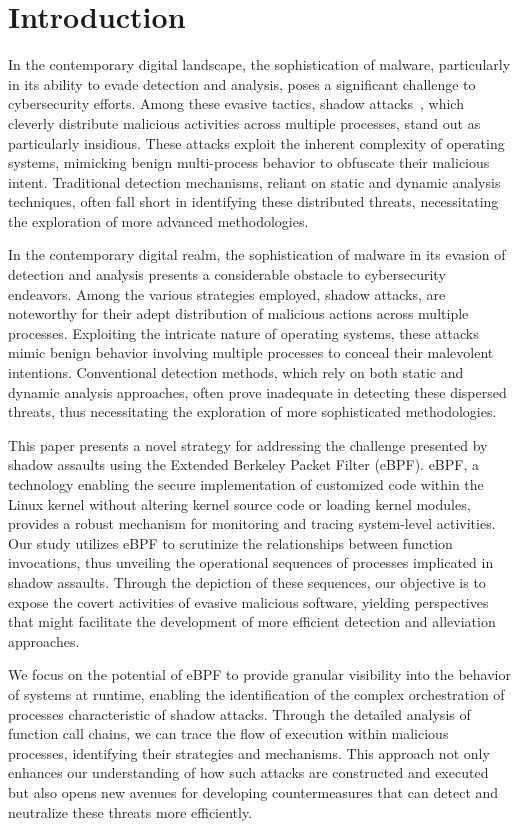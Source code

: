 \section{Introduction}
In the contemporary digital landscape, the sophistication of malware,
particularly in its ability to evade detection and analysis,
poses a significant challenge to cybersecurity efforts.
Among these evasive tactics, shadow attacks~\cite{Weiqin:ShadowAttack},
which cleverly distribute malicious activities across multiple processes,
stand out as particularly insidious.
These attacks exploit the inherent complexity of operating systems,
mimicking benign multi-process behavior to obfuscate their malicious intent.
Traditional detection mechanisms, reliant on static and dynamic analysis techniques,
often fall short in identifying these distributed threats,
necessitating the exploration of more advanced methodologies.

In the contemporary digital realm, the sophistication of malware in its evasion of detection and analysis presents a considerable obstacle to cybersecurity endeavors. Among the various strategies employed, shadow attacks\cite{Weiqin:ShadowAttack},
are noteworthy for their adept distribution of malicious actions across multiple processes.
Exploiting the intricate nature of operating systems, these attacks mimic benign behavior
involving multiple processes to conceal their malevolent intentions.
Conventional detection methods, which rely on both static and dynamic analysis approaches,
often prove inadequate in detecting these dispersed threats, thus necessitating the exploration of more sophisticated methodologies.

This paper presents a novel strategy for addressing the challenge presented by shadow assaults using the Extended Berkeley Packet Filter (eBPF). eBPF, a technology enabling the secure implementation of customized code within the Linux kernel without altering kernel source code or loading kernel modules, provides a robust mechanism for monitoring and tracing system-level activities. Our study utilizes eBPF to scrutinize the relationships between function invocations, thus unveiling the operational sequences of processes implicated in shadow assaults. Through the depiction of these sequences, our objective is to expose the covert activities of evasive malicious software, yielding perspectives that might facilitate the development of more efficient detection and alleviation approaches.

We focus on the potential of eBPF to provide granular visibility into the behavior
of systems at runtime, enabling the identification of the complex orchestration of
processes characteristic of shadow attacks. Through the detailed analysis of function
call chains, we can trace the flow of execution within malicious processes,
identifying their strategies and mechanisms. This approach not only enhances
our understanding of how such attacks are constructed and executed but also opens
new avenues for developing countermeasures that can detect and neutralize these threats more efficiently.

